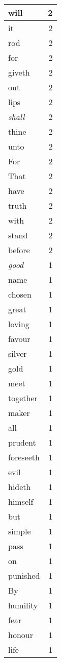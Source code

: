 \begin{center}
\begin{longtable}{l|r}
will & 2\\ \hline 
it & 2\\ \hline 
rod & 2\\ \hline 
for & 2\\ \hline 
giveth & 2\\ \hline 
out & 2\\ \hline 
lips & 2\\ \hline 
\emph{shall} & 2\\ \hline 
thine & 2\\ \hline 
unto & 2\\ \hline 
For & 2\\ \hline 
That & 2\\ \hline 
have & 2\\ \hline 
truth & 2\\ \hline 
with & 2\\ \hline 
stand & 2\\ \hline 
before & 2\\ \hline 
\emph{good} & 1\\ \hline 
name & 1\\ \hline 
chosen & 1\\ \hline 
great & 1\\ \hline 
loving & 1\\ \hline 
favour & 1\\ \hline 
silver & 1\\ \hline 
gold & 1\\ \hline 
meet & 1\\ \hline 
together & 1\\ \hline 
maker & 1\\ \hline 
all & 1\\ \hline 
prudent & 1\\ \hline 
foreseeth & 1\\ \hline 
evil & 1\\ \hline 
hideth & 1\\ \hline 
himself & 1\\ \hline 
but & 1\\ \hline 
simple & 1\\ \hline 
pass & 1\\ \hline 
on & 1\\ \hline 
punished & 1\\ \hline 
By & 1\\ \hline 
humility & 1\\ \hline 
fear & 1\\ \hline 
honour & 1\\ \hline 
life & 1\\ \hline 

\end{longtable}
\end{center}
